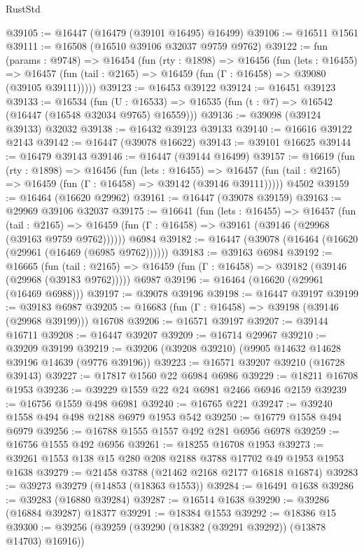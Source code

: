 \begin{lexlean}{RustStd}
\begin{coremodule}
@39105 := @16447 (@16479 (@39101 @16495) @16499)
@39106 := @16511 @1561
@39111 := @16508 (@16510 @39106 @32037 @9759 @9762)
@39122 := fun (params : @9748) =>
  @16454
    (fun (rty : @1898) =>
    @16456
      (fun (lets : @16455) =>
      @16457 (fun (tail : @2165) => @16459 (fun (Γ : @16458) => @39080 (@39105 @39111)))))
@39123 := @16453 @39122
@39124 := @16451 @39123
@39133 := @16534
    (fun (U : @16533) => @16535 (fun (t : @7) => @16542 (@16447 (@16548 @32034 @9765) @16559)))
@39136 := @39098 (@39124 @39133) @32032
@39138 := @16432 @39123 @39133
@39140 := @16616 @39122 @2143
@39142 := @16447 (@39078 @16622)
@39143 := @39101 @16625
@39144 := @16479 @39143
@39146 := @16447 (@39144 @16499)
@39157 := @16619
    (fun (rty : @1898) =>
    @16456
      (fun (lets : @16455) =>
      @16457 (fun (tail : @2165) => @16459 (fun (Γ : @16458) => @39142 (@39146 @39111)))))
    @4502
@39159 := @16464 (@16620 @29962)
@39161 := @16447 (@39078 @39159)
@39163 := @29969 @39106 @32037
@39175 := @16641
    (fun (lets : @16455) =>
    @16457
      (fun (tail : @2165) =>
      @16459 (fun (Γ : @16458) => @39161 (@39146 (@29968 (@39163 @9759 @9762))))))
    @6984
@39182 := @16447 (@39078 (@16464 (@16620 (@29961 (@16469 (@6985 @9762))))))
@39183 := @39163 @6984
@39192 := @16665
    (fun (tail : @2165) => @16459 (fun (Γ : @16458) => @39182 (@39146 (@29968 (@39183 @9762)))))
    @6987
@39196 := @16464 (@16620 (@29961 (@16469 @6988)))
@39197 := @39078 @39196
@39198 := @16447 @39197
@39199 := @39183 @6987
@39205 := @16683 (fun (Γ : @16458) => @39198 (@39146 (@29968 @39199))) @16708
@39206 := @16571 @39197
@39207 := @39144 @16711
@39208 := @16447 @39207
@39209 := @16714 @29967
@39210 := @39209 @39199
@39219 := @39206 (@39208 @39210) (@9905 @14632 @14628 @39196 @14639 (@9776 @39196))
@39223 := @16571 @39207 @39210 (@16728 @39143)
@39227 := @17817 @1560 @22 @6984 @6986
@39229 := @18211 @16708 @1953
@39236 := @39229 @1559 @22 @24 @6981 @2466 @6946 @2159
@39239 := @16756 @1559 @498 @6981
@39240 := @16765 @221
@39247 := @39240 @1558 @494 @498 @2188 @6979 @1953 @542
@39250 := @16779 @1558 @494 @6979
@39256 := @16788 @1555 @1557 @492 @281 @6956 @6978
@39259 := @16756 @1555 @492 @6956
@39261 := @18255 @16708 @1953
@39273 := @39261 @1553 @138 @15 @280 @208 @2188 @3788 @17702 @49 @1953 @1953 @1638
@39279 := @21458 @3788 (@21462 @2168 @2177 @16818 @16874)
@39283 := @39273 @39279 (@14853 (@18363 @1553))
@39284 := @16491 @1638
@39286 := @39283 (@16880 @39284)
@39287 := @16514 @1638
@39290 := @39286 (@16884 @39287) @18377
@39291 := @18384 @1553
@39292 := @18386 @15
@39300 := @39256 (@39259 (@39290 (@18382 (@39291 @39292)) (@13878 @14703) @16916))

\end{coremodule}
\end{lexlean}

